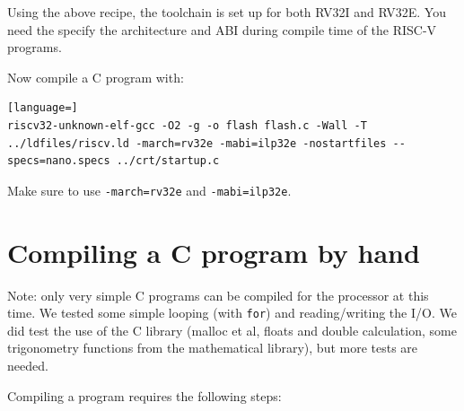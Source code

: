 \documentclass[12pt]{article}
\begin{document}
Using the above recipe, the toolchain is set up for both RV32I and RV32E. You need the specify the architecture and ABI during compile time of the RISC-V programs.

Now compile a C program with:

\begin{lstlisting}[language=]
riscv32-unknown-elf-gcc -O2 -g -o flash flash.c -Wall -T ../ldfiles/riscv.ld -march=rv32e -mabi=ilp32e -nostartfiles --specs=nano.specs ../crt/startup.c
\end{lstlisting}

Make sure to use \texttt{-march=rv32e} and \texttt{-mabi=ilp32e}.


\section{Compiling a C program by hand}
Note: only very simple C programs can be compiled for the processor at this time. We tested some simple looping (with \texttt{for}) and reading/writing the I/O. We did test the use of the C library (malloc et al, floats and double calculation, some trigonometry  functions from the mathematical library), but more tests are needed.

Compiling a program requires the following steps:
\end{document}
